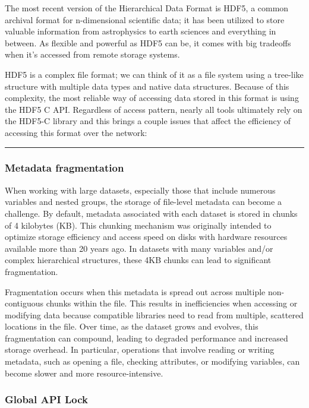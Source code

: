 \documentclass[
]{agujournal2019}
\begin{document}
The most recent version of the Hierarchical Data Format is HDF5, a
common archival format for n-dimensional scientific data; it has been
utilized to store valuable information from astrophysics to earth
sciences and everything in between. As flexible and powerful as HDF5 can
be, it comes with big tradeoffs when it's accessed from remote storage
systems.

HDF5 is a complex file format; we can think of it as a file system using
a tree-like structure with multiple data types and native data
structures. Because of this complexity, the most reliable way of
accessing data stored in this format is using the HDF5 C API. Regardless
of access pattern, nearly all tools ultimately rely on the HDF5-C
library and this brings a couple issues that affect the efficiency of
accessing this format over the network:

\begin{center}\rule{0.5\linewidth}{0.5pt}\end{center}

\subsubsection{\texorpdfstring{\textbf{Metadata
fragmentation}}{Metadata fragmentation}}\label{metadata-fragmentation}

When working with large datasets, especially those that include numerous
variables and nested groups, the storage of file-level metadata can
become a challenge. By default, metadata associated with each dataset is
stored in chunks of 4 kilobytes (KB). This chunking mechanism was
originally intended to optimize storage efficiency and access speed on
disks with hardware resources available more than 20 years ago. In
datasets with many variables and/or complex hierarchical structures,
these 4KB chunks can lead to significant fragmentation.

Fragmentation occurs when this metadata is spread out across multiple
non-contiguous chunks within the file. This results in inefficiencies
when accessing or modifying data because compatible libraries need to
read from multiple, scattered locations in the file. Over time, as the
dataset grows and evolves, this fragmentation can compound, leading to
degraded performance and increased storage overhead. In particular,
operations that involve reading or writing metadata, such as opening a
file, checking attributes, or modifying variables, can become slower and
more resource-intensive.

\subsubsection{\texorpdfstring{\textbf{Global API
Lock}}{Global API Lock}}\label{global-api-lock}
\end{document}
